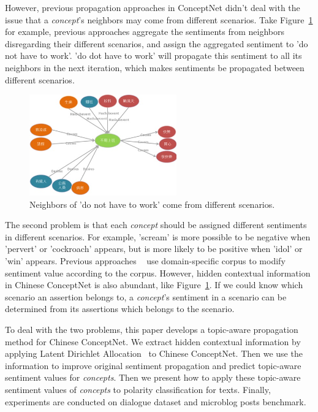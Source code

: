However, previous propagation approaches in ConceptNet didn't deal with the issue that a {\it concept}'s neighbors may come from different scenarios. Take Figure~\ref{fig:noWork2} for example, previous approaches aggregate the sentiments from neighbors disregarding their different scenarios, and assign the aggregated sentiment to 'do not have to work'. 'do dot have to work' will propagate this sentiment to all its neighbors in the next iteration, which makes sentiments be propagated between different scenarios.

\begin{figure}[!t]
\centering
\includegraphics[width=2.5in]{fig/noWork2.jpg}
\caption{Neighbors of 'do not have to work' come from different scenarios.}
\label{fig:noWork2}
\end{figure}

The second problem is that each {\it concept} should be assigned different sentiments in different scenarios. For example, 'scream' is more possible to be negative when 'pervert' or 'cockroach' appears, but is more likely to be positive when 'idol' or 'win' appears. Previous approaches ~\cite{Xu:PACLIC10, Xu:COLING10, Rao:WWW14} use domain-specific corpus to modify sentiment value according to the corpus. However, hidden contextual information in Chinese ConceptNet is also abundant, like Figure~\ref{fig:noWork2}. If we could know which scenario an assertion belongs to, a {\it concept}'s sentiment in a scenario can be determined from its assertions which belongs to the scenario. 

To deal with the two problems, this paper develops a topic-aware propagation method for Chinese ConceptNet. We extract hidden contextual information by applying Latent Dirichlet Allocation~\cite{Blei:LDA03} to Chinese ConceptNet. Then we use the information to improve original sentiment propagation and predict topic-aware sentiment values for {\it concepts}. Then we present how to apply these topic-aware sentiment values of {\it concepts} to polarity classification for texts. Finally, experiments are conducted on dialogue dataset and microblog posts benchmark.